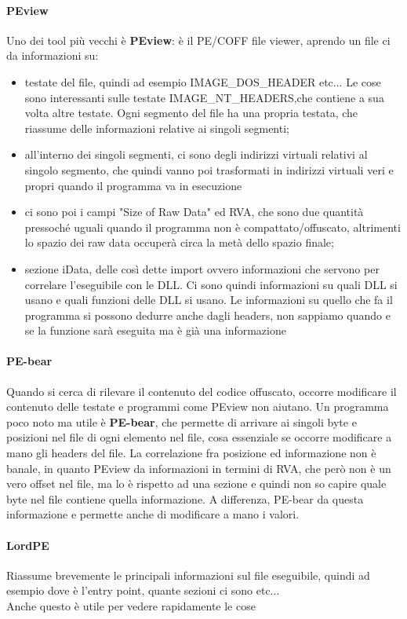 \documentclass[12pt, oneside]{extbook}
\begin{document}
\paragraph{PEview} Uno dei tool più vecchi è \textbf{PEview}: è il PE/COFF file viewer, aprendo un file ci da informazioni su:
\begin{itemize}
\item testate del file, quindi ad esempio IMAGE\_DOS\_HEADER etc... Le cose sono interessanti sulle testate IMAGE\_NT\_HEADERS,che contiene a sua volta altre testate. Ogni segmento del file ha una propria testata, che riassume delle informazioni relative ai singoli segmenti;
\item all'interno dei singoli segmenti, ci sono degli indirizzi virtuali relativi al singolo segmento, che quindi vanno poi trasformati in indirizzi virtuali veri e propri quando il programma va in esecuzione
\item ci sono poi i campi "Size of Raw Data" ed RVA, che sono due quantità pressoché uguali quando il programma non è compattato/offuscato, altrimenti lo spazio dei raw data occuperà circa la metà dello spazio finale;
\item sezione iData, delle così dette import ovvero informazioni che servono per correlare l'eseguibile con le DLL. Ci sono quindi informazioni su quali DLL si usano e quali funzioni delle DLL si usano. Le informazioni su quello che fa il programma si possono dedurre anche dagli headers, non sappiamo quando e se la funzione sarà eseguita ma è già una informazione
\end{itemize}
\paragraph{PE-bear} Quando si cerca di rilevare il contenuto del codice offuscato, occorre modificare il contenuto delle testate e programmi come PEview non aiutano. Un programma poco noto ma utile è \textbf{PE-bear}, che permette di arrivare ai singoli byte e posizioni nel file di ogni elemento nel file, cosa essenziale se occorre modificare a mano gli headers del file. La correlazione fra posizione ed informazione non è banale, in quanto PEview da informazioni in termini di RVA, che però non è un vero offset nel file, ma lo è rispetto ad una sezione e quindi non so capire quale byte nel file contiene quella informazione. A differenza, PE-bear da questa informazione e permette anche di modificare a mano i valori.
\\
\paragraph{LordPE}
Riassume brevemente le principali informazioni sul file eseguibile, quindi ad esempio dove è l'entry point, quante sezioni ci sono etc... \\ Anche questo è utile per vedere rapidamente le cose
\\
\end{document}
